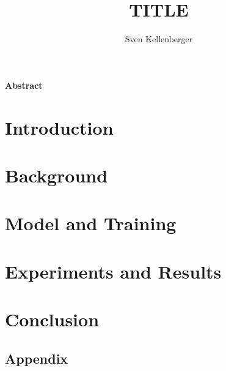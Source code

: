 \documentclass[a4paper]{report}
\begin{document}
\pagestyle{fancyplain} \thispagestyle{empty}

\title{TITLE}
\author{Sven Kellenberger}

 \setcounter{page}{1}
\maketitle

\newpage
\thispagestyle{empty}
\vspace{8cm}
\noindent
{\centerline {\bf \large Abstract}}
\vspace{1cm}


\noindent



 \setcounter{page}{1}
\tableofcontents
\newpage{\pagestyle{empty} \cleardoublepage}

 \setcounter{page}{1}
\pagestyle{fancy}

\chapter{Introduction}

\newpage{\pagestyle{empty} \cleardoublepage}

\chapter{Background}

\newpage{\pagestyle{empty} \cleardoublepage}

\chapter{Model and Training}

\newpage{\pagestyle{empty} \cleardoublepage}

\chapter{Experiments and Results}

\newpage{\pagestyle{empty} \cleardoublepage}

\chapter{Conclusion}

\newpage{\pagestyle{empty} \cleardoublepage}

\begin{appendix}
\chapter{Appendix}

\newpage{\pagestyle{empty} \cleardoublepage}
\end{appendix}
\end{document}
